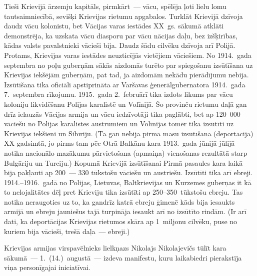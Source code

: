 \documentclass[twoside,a5paper,12pt,fleqn,openany]{extbook}
\begin{document}
Tieši Krievijā ārzemju kapitāls, pirmkārt~--- vācu, spēlēja ļoti lielu lomu tautsaimniecībā, sevišķi Krievijas rietumu apgabalos. Turklāt Krievijā dzīvoja daudz vācu kolonistu, bet Vācijas varas iestādes XX~gs. sākumā atklāti demonstrēja, ka uzskata vācu diasporu par vācu nācijas daļu, bez izšķirības, kādas valsts pavalstnieki vācieši bija. Daudz šādu cilvēku dzīvoja arī Polijā. Protams, Krievijas varas iestādes neuzticējās vietējiem vāciešiem. No 1914.~gada septembra no poļu guberņām sākās aizdomās turēto par spiegošanu izsūtīšana uz Krievijas iekšējām guberņām, pat tad, ja aizdomām nekādu pierādījumu nebija. Izsūtīšana tika oficiāli apstiprināta ar Varšavas ģenerālgubernatora 1914.~gada 7.~septembra rīkojumu. 1915.~gada 2.~februārī tika izdots likums par vācu koloniju likvidēšanu Polijas karalistē un Volīnijā. Šo provinču rietumu daļā gan drīz ielauzās Vācijas armija un vācu iedzīvotāji tika paglābti, bet ap 120~000 vāciešu no Polijas karalistes austrumiem un Volīnijas tomēr tika izsūtīti uz Krievijas iekšieni un Sibīriju. (Tā gan nebija pirmā masu izsūtīšana (deportācija) XX gadsimtā, jo pirms tam pēc Otrā Balkānu kara 1913.~gada jūnijā-jūlijā notika nacionālo mazākumu pārvietošana (apmaiņa) vienošanas rezultātā starp Bulgāriju un Turciju.) Kopumā Krievijā izsūtīšanai Pirmā pasaules kara laikā bija pakļauti ap 200~--- 330 tūkstošu vāciešu un austriešu. Izsūtīti tika arī ebreji. 1914.--1916.~gadā no Polijas, Lietuvas, Baltkrievijas un Kurzemes guberņas it kā to nelojalitātes dēļ pret Krieviju tika izsūtīti ap 250--350~tūkstošu ebreju. Tas notika neraugoties uz to, ka gandrīz katrā ebreju ģimenē kāds bija iesaukts armijā un ebreju jauniešus tajā turpināja iesaukt arī no izsūtīto rindām. (Ir arī dati, ka deportācijas Krievijas rietumos skāra ap 1~miljonu cilvēku, puse no kuriem bija vācieši, trešā daļa~--- ebreji.)

Krievijas armijas virspavēlnieks lielkņazs Nikolajs Nikolajevičs tūlīt kara sākumā~--- 1.~(14.)~augustā~--- izdeva manifestu, kuru laikabiedri pierakstīja viņa personīgajai iniciatīvai.
\end{document}
